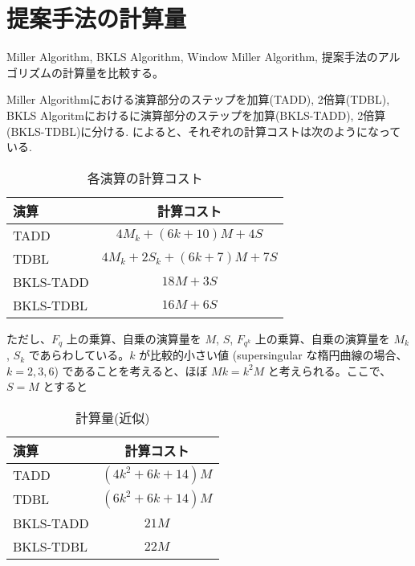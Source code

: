 \section{提案手法の計算量}
Miller Algorithm, BKLS Algorithm, Window Miller Algorithm, 提案手法のアルゴリズムの計算量を比較する。
\par
Miller Algorithmにおける演算部分のステップを加算(TADD), 2倍算(TDBL), BKLS Algoritmにおけるに演算部分のステップを加算(BKLS-TADD), 2倍算(BKLS-TDBL)に分ける. \cite{TATE}によると、それぞれの計算コストは次のようになっている.
\begin{table}[htbp]
 \begin{center}
  \begin{tabular}{|l|c|}
  \hline
  演算 & 計算コスト \\
  \hline
  TADD & $4M_k + (6k+10)M + 4S$ \\
  \hline
  TDBL & $4M_k + 2S_k + (6k+7)M + 7S$ \\
  \hline
  BKLS-TADD & $18M + 3S$ \\
  \hline
  BKLS-TDBL & $16M + 6S$ \\
  \hline
  \end{tabular}
 \end{center}
 \caption{各演算の計算コスト}
\end{table}
\par
ただし、$F_q$ 上の乗算、自乗の演算量を $M$, $S$, $F_{q^k}$ 上の乗算、自乗の演算量を $M_k$, $S_k$ であらわしている。$k$ が比較的小さい値 (supersingular な楕円曲線の場合、$k = 2, 3, 6$) であることを考えると、ほぼ $Mk = k^2M$ と考えられる。ここで、 $S = M$ とすると \\

\begin{table}[htbp]
\begin{center}
\begin{tabular}{|l|c|}
\hline
 演算 & 計算コスト\\
 \hline
 TADD & $(4k^2 + 6k + 14)M$ \\
 \hline
 TDBL & $(6k^2 + 6k + 14)M$ \\
 \hline
  BKLS-TADD & $21M$ \\
  \hline
  BKLS-TDBL & $22M$ \\
  \hline
\end{tabular}
\end{center}
\caption{計算量(近似)}
\end{table}

